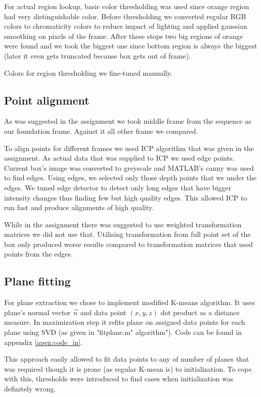 \documentclass{article}
\begin{document}
For actual region lookup, basic color thresholding was used
since orange region had very distinguishable color. Before 
thresholding we converted regular RGB colors
to chromaticity colors to reduce impact of lighting
and applied gaussian smoothing on pixels of
the frame. After these stops two big regions of
orange were found and we took the biggest one
since bottom region is always the biggest (later it 
even gets truncated because box gets out of frame).

Colors for region thresholding we fine-tuned manually.

\subsection{Point alignment}
As was suggested in the assignment we took middle frame
from the sequence as our foundation frame. Against it all
other frame we compared.

To align points for different frames we used ICP algorithm
that was given in the assignment. As actual data that was 
supplied to ICP we used edge points. Current box's image
was converted to greyscale and MATLAB's canny was used
to find edges. Using edges, we selected only those
depth points that we under the edges. We tuned edge
detector to detect only long edges that have bigger
intensity changes thus finding few but high quality edges.
This allowed ICP to run fast and produce alignments
of high quality.

While in the assignment there was suggested to use
weighted transformation matrices we did not use that.
Utilising transformation from full point set of 
the box only produced worse results compared
to transformation matrices that used points from 
the edges.

\subsection{Plane fitting}
For plane extraction we chose to implement modified K-means algorithm.
It uses plane's normal vector $\vec{n}$  and data point $ (x,y,z) $
dot product as a distance measure. In maximization step it refits
plane on assigned data points for each plane
 using SVD (as given in "fitplane.m"
algorithm"). Code can be found in appendix \ref{apen:code_in}.

This approach easily allowed to fit data points to any of number of
planes that was required though it is prone (as regular K-mean is)
to initialization. To cope with this, thresholds were introduced
to find cases when initialization was definitely wrong.
\end{document}
